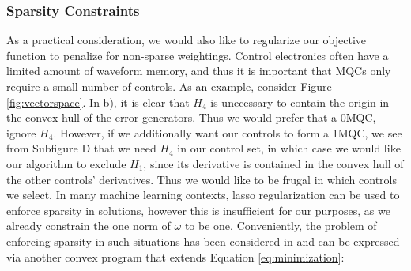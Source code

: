\documentclass[aps,nofootinbib,pra,notitlepage,twocolumn]{revtex4-1}
\begin{document}

\subsubsection{Sparsity Constraints}

As a practical consideration, we would also like to regularize our objective function to penalize for non-sparse weightings. Control electronics often have a limited amount of waveform memory, and thus it is important that MQCs only require a small number of controls. As an example, consider Figure \ref{fig:vectorspace}. In b), it is clear that $H_4$ is unecessary to contain the origin in the convex hull of the error generators. Thus we would prefer that a $0$MQC, ignore $H_4$. However, if we additionally want our controls to form a 1MQC, we see from Subfigure D that we need $H_4$ in our control set, in which case we would like our algorithm to exclude $H_1$, since its derivative is contained in the convex hull of the other controls' derivatives. Thus we would like to be frugal in which controls we select. In many machine learning contexts, lasso regularization \cite{tibshirani1996regression} can be used to enforce sparsity in solutions, however this is insufficient for our purposes, as we already constrain the one norm of $\omega$ to be one. Conveniently, the problem of enforcing sparsity in such situations has been considered in \cite{NIPS2012_4504} and can be expressed via another convex program that extends Equation \ref{eq:minimization}:
\end{document}
